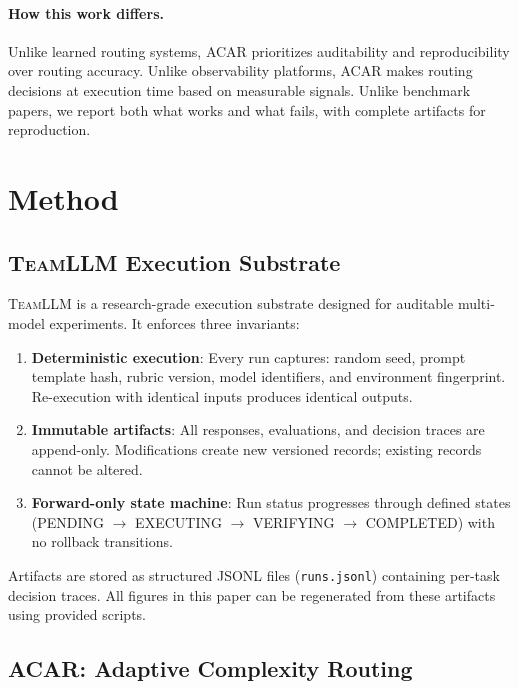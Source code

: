 \documentclass{article}
\newcommand{\acar}{\textsc{ACAR}}
\newcommand{\teamllm}{\textsc{TeamLLM}}
\begin{document}
\paragraph{How this work differs.}
Unlike learned routing systems, \acar{} prioritizes auditability and reproducibility over routing accuracy. Unlike observability platforms, \acar{} makes routing decisions at execution time based on measurable signals. Unlike benchmark papers, we report both what works and what fails, with complete artifacts for reproduction.

\section{Method}

\subsection{\teamllm{} Execution Substrate}

\teamllm{} is a research-grade execution substrate designed for auditable multi-model experiments. It enforces three invariants:

\begin{enumerate}[leftmargin=*, itemsep=2pt]
    \item \textbf{Deterministic execution}: Every run captures: random seed, prompt template hash, rubric version, model identifiers, and environment fingerprint. Re-execution with identical inputs produces identical outputs.
    \item \textbf{Immutable artifacts}: All responses, evaluations, and decision traces are append-only. Modifications create new versioned records; existing records cannot be altered.
    \item \textbf{Forward-only state machine}: Run status progresses through defined states (PENDING $\to$ EXECUTING $\to$ VERIFYING $\to$ COMPLETED) with no rollback transitions.
\end{enumerate}

Artifacts are stored as structured JSONL files (\texttt{runs.jsonl}) containing per-task decision traces. All figures in this paper can be regenerated from these artifacts using provided scripts.

\subsection{\acar{}: Adaptive Complexity Routing}
\end{document}
